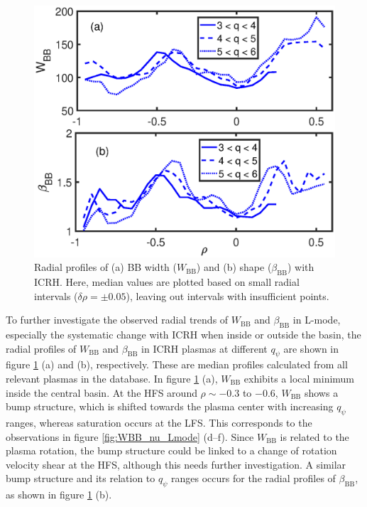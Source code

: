 \begin{figure}[!h]
\begin{centering}
\includegraphics[scale=0.57]{fig_WBB_betaBB_prof.eps}
\par\end{centering}
\caption{Radial profiles of (a) BB width ($W_\mathrm{BB}$) and (b) shape ($\beta_\mathrm{BB}$) with ICRH. Here, median values are plotted based on small radial intervals ($\delta\rho=\pm0.05$), leaving out intervals with insufficient points.}
\label{fig:fig_WBB_betaBB_prof}
\end{figure}


To further investigate the observed radial trends of $W_\mathrm{BB}$ and $\beta_\mathrm{BB}$ in L-mode, especially the systematic change with ICRH when inside or outside the basin, the radial profiles of $W_\mathrm{BB}$ and $\beta_\mathrm{BB}$ in ICRH plasmas at different $q_{\psi}$ are shown in figure \ref{fig:fig_WBB_betaBB_prof} (a) and (b), respectively. These are median profiles calculated from all relevant plasmas in the database. In figure \ref{fig:fig_WBB_betaBB_prof} (a), $W_\mathrm{BB}$ exhibits a local minimum inside the central basin. At the HFS around $\rho\sim -0.3$ to $-0.6$, $W_\mathrm{BB}$ shows a bump structure, which is shifted towards the plasma center with increasing $q_{\psi}$ ranges, whereas saturation occurs at the LFS. This corresponds to the observations in figure \ref{fig:WBB_nu_Lmode} (d--f). Since $W_\mathrm{BB}$ is related to the plasma rotation, the bump structure could be linked to a change of rotation velocity shear at the HFS, although this needs further investigation. A similar bump structure and its relation to $q_{\psi}$ ranges occurs for the radial profiles of $\beta_\mathrm{BB}$, as shown in figure \ref{fig:fig_WBB_betaBB_prof} (b).


